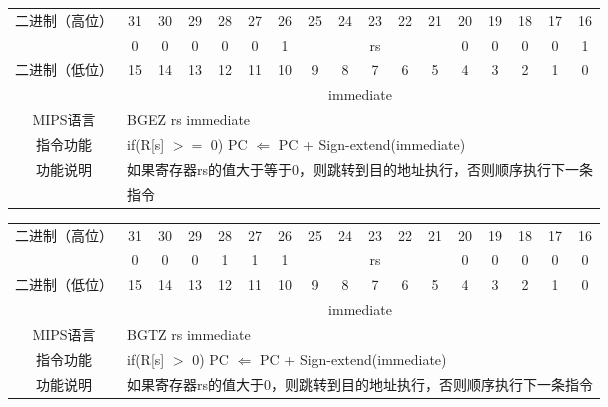 \begin{table}
\begin{tabular}{|c|c|c|c|c|c|c|c|c|c|c|c|c|c|c|c|c|}
\hline
\multirow{2}{*}{二进制（高位）} &
31&30&29&28&27&26&25&24&23&22&21&20&19&18&17&16\\
\cline{2-17}
&
0&0&0&0&0&
1&
\multicolumn{5}{c|}{rs}&
0&0&0&0&1\\
\hline
\multirow{2}{*}{二进制（低位）} &
15&14&13&12&11&10&9&8&7&6&5&4&3&2&1&0\\
\cline{2-17}
&
\multicolumn{16}{c|}{immediate}\\
\hline
MIPS语言&
\multicolumn{16}{l|}{BGEZ rs immediate}\\
\hline
指令功能&
\multicolumn{16}{l|}{if(R[s] $>=$ 0) PC $\Leftarrow$ PC + Sign-extend(immediate)}\\
\hline
\multirow{2}{*}{功能说明}&
\multicolumn{16}{l|}{如果寄存器rs的值大于等于0，则跳转到目的地址执行，否则顺序执行下一条}\\
&\multicolumn{16}{l|}{指令}\\
\hline
\end{tabular}
\end{table}

\clearpage

\begin{table}
\begin{tabular}{|c|c|c|c|c|c|c|c|c|c|c|c|c|c|c|c|c|}
\hline
\multirow{2}{*}{二进制（高位）} &
31&30&29&28&27&26&25&24&23&22&21&20&19&18&17&16\\
\cline{2-17}
&
0&0&0&1&1&
1&
\multicolumn{5}{c|}{rs}&
0&0&0&0&0\\
\hline
\multirow{2}{*}{二进制（低位）} &
15&14&13&12&11&10&9&8&7&6&5&4&3&2&1&0\\
\cline{2-17}
&
\multicolumn{16}{c|}{immediate}\\
\hline
MIPS语言&
\multicolumn{16}{l|}{BGTZ rs immediate}\\
\hline
指令功能&
\multicolumn{16}{l|}{if(R[s] $>$ 0) PC $\Leftarrow$ PC + Sign-extend(immediate)}\\
\hline
功能说明&
\multicolumn{16}{l|}{如果寄存器rs的值大于0，则跳转到目的地址执行，否则顺序执行下一条指令}\\
\hline
\end{tabular}
\end{table}

